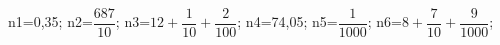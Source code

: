 \documentclass[exercice]{thedocument}%
\begin{document}
%
    \>n1={0,35};%
    \>n2=$\dfrac{687}{10}$;%
    \>n3=$12+\dfrac1{10}+\dfrac2{100}$;%
    \>n4={74,05};%
    \>n5=$\dfrac{1}{1000}$;%
    \>n6=$8+\dfrac7{10}+\dfrac9{1000}$;%
\end{document}
